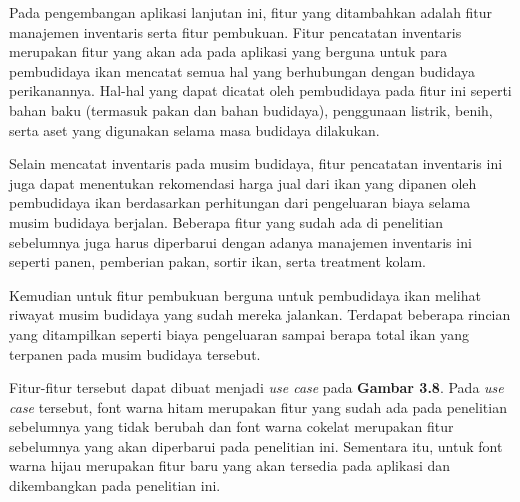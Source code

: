 Pada pengembangan aplikasi lanjutan ini, fitur yang ditambahkan adalah fitur manajemen inventaris serta fitur pembukuan. Fitur pencatatan inventaris merupakan fitur yang akan ada pada aplikasi yang berguna untuk para pembudidaya ikan mencatat semua hal yang berhubungan dengan budidaya perikanannya. Hal-hal yang dapat dicatat oleh pembudidaya pada fitur ini seperti bahan baku (termasuk pakan dan bahan budidaya), penggunaan listrik, benih, serta aset yang digunakan selama masa budidaya dilakukan.

Selain mencatat inventaris pada musim budidaya, fitur pencatatan inventaris ini juga dapat menentukan rekomendasi harga jual dari ikan yang dipanen oleh pembudidaya ikan berdasarkan perhitungan dari pengeluaran biaya selama musim budidaya berjalan. Beberapa fitur yang sudah ada di penelitian sebelumnya juga harus diperbarui dengan adanya manajemen inventaris ini seperti panen, pemberian pakan, sortir ikan, serta treatment kolam.

Kemudian untuk fitur pembukuan berguna untuk pembudidaya ikan melihat riwayat musim budidaya yang sudah mereka jalankan. Terdapat beberapa rincian yang ditampilkan seperti biaya pengeluaran sampai berapa total ikan yang terpanen pada musim budidaya tersebut.

Fitur-fitur tersebut dapat dibuat menjadi \textit{use case} pada \textbf{Gambar 3.8}. Pada \textit{use case} tersebut, font warna hitam merupakan fitur yang sudah ada pada penelitian sebelumnya yang tidak berubah dan font warna cokelat merupakan fitur sebelumnya yang akan diperbarui pada penelitian ini. Sementara itu, untuk font warna hijau merupakan fitur baru yang akan tersedia pada aplikasi dan dikembangkan pada penelitian ini.

